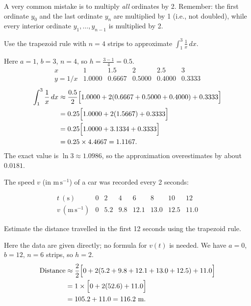 \documentclass[11pt]{article}
\begin{document}
\begin{attention}
A very common mistake is to multiply \emph{all} ordinates by 2. Remember: the first ordinate $y_0$ and the last ordinate $y_n$ are multiplied by 1 (i.e., not doubled), while every interior ordinate $y_1,\dots,y_{n-1}$ is multiplied by 2.
\end{attention}

\begin{exemplebox}
Use the trapezoid rule with $n=4$ strips to approximate $\int_1^3 \frac{1}{x}\,dx$.
\end{exemplebox}

\begin{exoresolu}[Solution]
Here $a=1$, $b=3$, $n=4$, so $h = \frac{3-1}{4} = 0.5$.
\[
\begin{array}{c|ccccc}
x & 1 & 1.5 & 2 & 2.5 & 3 \\ \hline
y = 1/x & 1.0000 & 0.6667 & 0.5000 & 0.4000 & 0.3333
\end{array}
\]
\[
\begin{aligned}
\int_1^3 \frac{1}{x}\,dx &\approx \frac{0.5}{2}\Bigl[ 1.0000 + 2(0.6667+0.5000+0.4000) + 0.3333 \Bigr] \\
&= 0.25\Bigl[ 1.0000 + 2(1.5667) + 0.3333 \Bigr] \\
&= 0.25\Bigl[ 1.0000 + 3.1334 + 0.3333 \Bigr] \\
&= 0.25 \times 4.4667 = 1.1167.
\end{aligned}
\]
The exact value is $\ln 3 \approx 1.0986$, so the approximation overestimates by about $0.0181$.
\end{exoresolu}

\begin{exemplebox}
The speed $v$ (in $\mathrm{m\,s^{-1}}$) of a car was recorded every 2 seconds:

\[
\begin{array}{c|ccccccc}
t\ (\mathrm{s}) & 0 & 2 & 4 & 6 & 8 & 10 & 12 \\ \hline
v\ (\mathrm{m\,s^{-1}}) & 0 & 5.2 & 9.8 & 12.1 & 13.0 & 12.5 & 11.0
\end{array}
\]

Estimate the distance travelled in the first 12 seconds using the trapezoid rule.
\end{exemplebox}

\begin{exoresolu}[Solution]
Here the data are given directly; no formula for $v(t)$ is needed. We have $a=0$, $b=12$, $n=6$ strips, so $h = 2$.
\[
\begin{aligned}
\text{Distance} &\approx \frac{2}{2}\Bigl[ 0 + 2(5.2+9.8+12.1+13.0+12.5) + 11.0 \Bigr] \\
&= 1 \times \Bigl[ 0 + 2(52.6) + 11.0 \Bigr] \\
&= 105.2 + 11.0 = 116.2\ \mathrm{m}.
\end{aligned}
\]
\end{exoresolu}
\end{document}
